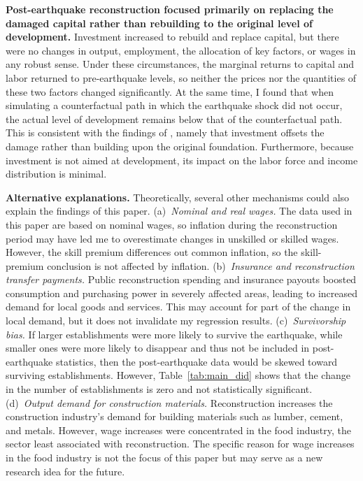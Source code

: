 \documentclass[12pt]{article}
\begin{document}
\textbf{Post-earthquake reconstruction focused primarily on replacing the damaged capital rather than
rebuilding to the original level of development.} Investment increased to rebuild and replace capital,
but there were no changes in output, employment, the allocation of key factors, or wages in any robust
sense. Under these circumstances, the marginal returns to capital and labor returned to pre-earthquake
levels, so neither the prices nor the quantities of these two factors changed significantly. At the same
time, I found that when simulating a counterfactual path in which the earthquake shock did not occur, the
actual level of development remains below that of the counterfactual path. This is consistent with the
findings of \citet{diaz2024}, namely that investment offsets the damage rather than building upon the
original foundation. Furthermore, because investment is not aimed at development, its impact on the labor
force and income distribution is minimal.

\textbf{Alternative explanations.} Theoretically, several other mechanisms could also explain the findings
of this paper. (a)~\emph{Nominal and real wages.} The data used in this paper are based on nominal wages,
so inflation during the reconstruction period may have led me to overestimate changes in unskilled or
skilled wages. However, the skill premium differences out common inflation, so the skill-premium
conclusion is not affected by inflation. (b)~\emph{Insurance and reconstruction transfer payments.} Public
reconstruction spending and insurance payouts boosted consumption and purchasing power in severely
affected areas, leading to increased demand for local goods and services. This may account for part of
the change in local demand, but it does not invalidate my regression results. (c)~\emph{Survivorship
bias.} If larger establishments were more likely to survive the earthquake, while smaller ones were more
likely to disappear and thus not be included in post-earthquake statistics, then the post-earthquake data
would be skewed toward surviving establishments. However, Table~\ref{tab:main_did} shows that the change
in the number of establishments is zero and not statistically significant. (d)~\emph{Output demand for
construction materials.} Reconstruction increases the construction industry's demand for building
materials such as lumber, cement, and metals. However, wage increases were concentrated in the food
industry, the sector least associated with reconstruction. The specific reason for wage increases in the
food industry is not the focus of this paper but may serve as a new research idea for the future.
\end{document}

